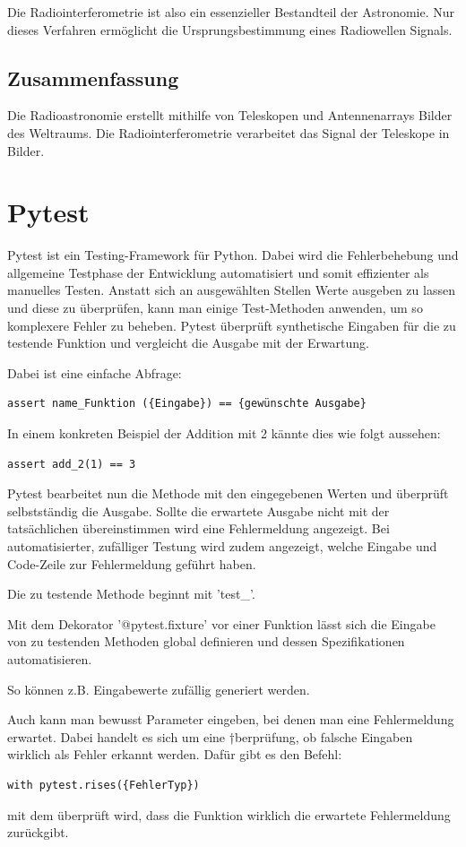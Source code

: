 \documentclass[]{dsadokumentation}
\begin{document}
Die Radiointerferometrie ist also ein essenzieller Bestandteil der Astronomie. Nur dieses Verfahren ermöglicht die Ursprungsbestimmung eines Radiowellen Signals.

\subsection{Zusammenfassung}
Die Radioastronomie erstellt mithilfe von Teleskopen und Antennenarrays Bilder des Weltraums. Die Radiointerferometrie verarbeitet das Signal der Teleskope in Bilder.

\section{Pytest}
Pytest ist ein Testing-Framework für Python. Dabei wird die Fehlerbehebung und allgemeine Testphase der Entwicklung automatisiert und somit effizienter als manuelles Testen. Anstatt sich an ausgewählten Stellen Werte ausgeben zu lassen und diese zu überprüfen, kann man einige Test-Methoden anwenden, um so komplexere Fehler zu beheben. Pytest überprüft synthetische Eingaben für die zu testende Funktion und vergleicht die Ausgabe mit der Erwartung.

Dabei ist eine einfache Abfrage:

\begin{verbatim}
assert name_Funktion ({Eingabe}) == {gewünschte Ausgabe}
\end{verbatim}
In einem konkreten Beispiel der Addition mit 2 kännte dies wie folgt aussehen:
\begin{verbatim}
assert add_2(1) == 3
\end{verbatim}
 Pytest bearbeitet nun die Methode mit den eingegebenen Werten und überprüft selbstständig die Ausgabe. Sollte die erwartete Ausgabe nicht mit der tatsächlichen übereinstimmen wird eine Fehlermeldung angezeigt. Bei automatisierter, zufälliger Testung wird zudem angezeigt, welche Eingabe und Code-Zeile zur Fehlermeldung geführt haben.

Die zu testende Methode beginnt mit 'test\_'.

 Mit dem Dekorator '@pytest.fixture' vor einer Funktion lässt sich die Eingabe von zu testenden Methoden global definieren und dessen Spezifikationen automatisieren.

So können z.B. Eingabewerte zufällig generiert werden.

Auch kann man bewusst Parameter eingeben, bei denen man eine Fehlermeldung erwartet. Dabei handelt es sich um eine †berprüfung, ob falsche Eingaben wirklich als Fehler erkannt werden. Dafür gibt es den Befehl:
\begin{verbatim}
with pytest.rises({FehlerTyp})
\end{verbatim}
 mit dem überprüft wird, dass die Funktion wirklich die erwartete Fehlermeldung zurückgibt.
\end{document}
